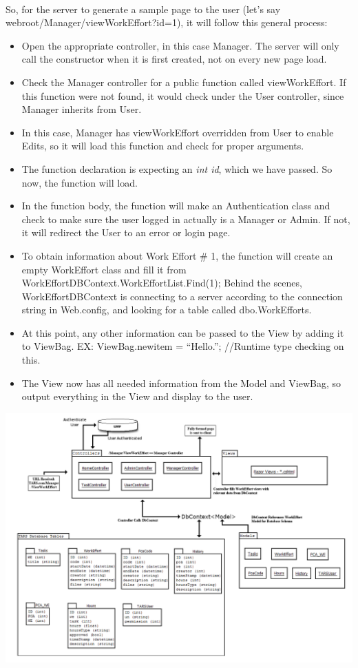 \documentclass[letterpaper]{article}
\begin{document}
\paragraph{}
So, for the server to generate a sample page to the user (let's say webroot/Manager/viewWorkEffort?id=1), it will follow this general process:
\begin{itemize}
\item Open the appropriate controller, in this case Manager. The server will only call the constructor when it is first created, not on every new page load.
\item Check the Manager controller for a public function called viewWorkEffort. If this function were not found, it would check under the User controller, since Manager inherits from User.
\item In this case, Manager has viewWorkEffort overridden from User to enable Edits, so it will load this function and check for proper arguments. 
\item The function declaration is expecting an \emph{int id}, which we have passed. So now, the function will load.
\item In the function body, the function will make an Authentication class and check to make sure the user logged in actually is a Manager or Admin. If not, it will redirect the User to an error or login page.
\item To obtain information about Work Effort \# 1, the function will create an empty WorkEffort class and fill it from WorkEffortDBContext.WorkEffortList.Find(1); Behind the scenes, WorkEffortDBContext is connecting to a server according to the connection string in Web.config, and looking for a table called dbo.WorkEfforts.
\item At this point, any other information can be passed to the View by adding it to ViewBag. EX: ViewBag.newitem = ``Hello.'';  //Runtime type checking on this.
\item The View now has all needed information from the Model and ViewBag, so output everything in the View and display to the user.
\end{itemize}
\begin{centering}
\includegraphics[scale=0.4]{erd_flow.png}
\end{centering}
\pagebreak
\end{document}
